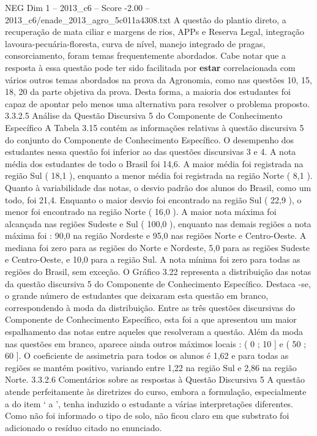 \begin{textsample}{NEG Dim 1 – 2013\_c6 – Score -2.00 – 2013\_c6/enade\_2013\_agro\_5c011a4308.txt}
A questão do plantio direto, a recuperação de mata ciliar e margens de rios, APPs e Reserva Legal, integração lavoura-pecuária-floresta, curva de nível, manejo integrado de pragas, consorciamento, foram temas frequentemente abordados.
Cabe notar que a resposta à essa questão pode ter sido facilitada por \textbf{estar} correlacionada com vários outros temas abordados na prova da Agronomia, como nas questões 10, 15, 18, 20 da parte objetiva da prova.
Desta forma, a maioria dos estudantes foi capaz de apontar pelo menos uma alternativa para resolver o problema proposto. 3.3.2.5 Análise da Questão Discursiva 5 do Componente de Conhecimento Específico A Tabela 3.15 contém as informações relativas à questão discursiva 5 do conjunto do Componente de Conhecimento Específico.
O desempenho dos estudantes nessa questão foi inferior ao das questões discursivas 3 e 4.
A nota média dos estudantes de todo o Brasil foi 14,6.
A maior média foi registrada na região Sul ( 18,1 ), enquanto a menor média foi registrada na região Norte ( 8,1 ).
Quanto à variabilidade das notas, o desvio padrão dos alunos do Brasil, como um todo, foi 21,4.
Enquanto o maior desvio foi encontrado na região Sul ( 22,9 ), o menor foi encontrado na região Norte ( 16,0 ).
A maior nota máxima foi alcançada nas regiões Sudeste e Sul ( 100,0 ), enquanto nas demais regiões a nota máxima foi : 90,0 na região Nordeste e 95,0 nas regiões Norte e Centro-Oeste.
A mediana foi zero para as regiões do Norte e Nordeste, 5,0 para as regiões Sudeste e Centro-Oeste, e 10,0 para a região Sul.
A nota mínima foi zero para todas as regiões do Brasil, sem exceção.
O Gráfico 3.22 representa a distribuição das notas da questão discursiva 5 do Componente de Conhecimento Específico.
Destaca -se, o grande número de estudantes que deixaram esta questão em branco, correspondendo à moda da distribuição.
Entre as três questões discursivas do Componente de Conhecimento Específico, esta foi a que apresentou um maior espalhamento das notas entre aqueles que resolveram a questão.
Além da moda nas questões em branco, aparece ainda outros máximos locais : ( 0 ; 10 ] e ( 50 ; 60 ].
O coeficiente de assimetria para todos os alunos é 1,62 e para todas as regiões se mantém positivo, variando entre 1,22 na região Sul e 2,86 na região Norte. 3.3.2.6 Comentários sobre as respostas à Questão Discursiva 5 A questão atende perfeitamente às diretrizes do curso, embora a formulação, especialmente a do item ‘ a ’, tenha induzido o estudante a várias interpretações diferentes.
Como não foi informado o tipo de solo, não ficou claro em que substrato foi adicionado o resíduo citado no enunciado.

\end{textsample}
